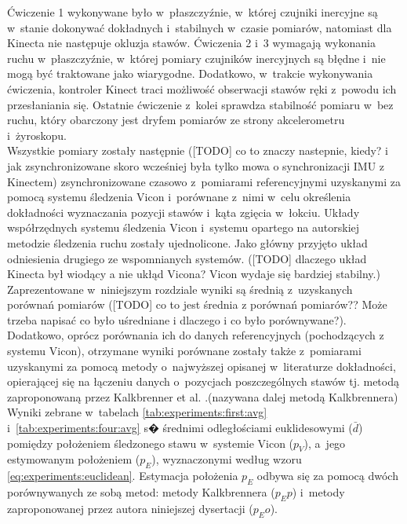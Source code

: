 Ćwiczenie 1 wykonywane było w~płaszczyźnie, w~której czujniki inercyjne są w~stanie dokonywać dokładnych i~stabilnych w~czasie pomiarów, natomiast dla Kinecta nie następuje okluzja stawów. Ćwiczenia 2 i~3 wymagają wykonania ruchu w~płaszczyźnie, w~której pomiary czujników inercyjnych są błędne i~nie mogą być traktowane jako wiarygodne. Dodatkowo, w~trakcie wykonywania ćwiczenia, kontroler Kinect traci możliwość obserwacji stawów ręki z~powodu ich przesłaniania się. Ostatnie ćwiczenie z~kolei sprawdza stabilność pomiaru w~bez ruchu, który obarczony jest dryfem pomiarów ze strony akcelerometru i~żyroskopu.\\

Wszystkie pomiary zostały następnie ([TODO] co to znaczy nastepnie, kiedy? i jak zsynchronizowane skoro wcześniej była tylko mowa o synchronizacji IMU z Kinectem) zsynchronizowane czasowo z~pomiarami referencyjnymi uzyskanymi za pomocą systemu śledzenia Vicon i~porównane z~nimi w~celu określenia dokładności wyznaczania pozycji stawów i~kąta zgięcia w~łokciu. Układy współrzędnych systemu śledzenia Vicon i~systemu opartego na autorskiej metodzie śledzenia ruchu zostały ujednolicone. Jako główny przyjęto układ odniesienia drugiego ze wspomnianych systemów. ([TODO] dlaczego układ Kinecta był wiodący a nie ukłąd Vicona? Vicon wydaje się bardziej stabilny.) Zaprezentowane w~niniejszym rozdziale wyniki są średnią z~uzyskanych porównań pomiarów ([TODO] co to jest średnia z porównań pomiarów?? Może trzeba napisać co było uśredniane i dlaczego i co było porównywane?). Dodatkowo, oprócz porównania ich do danych referencyjnych (pochodzących z systemu Vicon), otrzymane wyniki porównane zostały także z~pomiarami uzyskanymi za pomocą metody o~najwyższej opisanej w~literaturze dokładności, opierającej się na łączeniu danych o~pozycjach poszczególnych stawów tj. metodą zaproponowaną przez Kalkbrenner et al. \cite{Kalkbrenner2014}.(nazywana dalej metodą Kalkbrennera)\\
Wyniki zebrane w~tabelach \ref{tab:experiments:first:avg} i~\ref{tab:experiments:four:avg} s� średnimi odległościami euklidesowymi ($\bar{d}$) pomiędzy położeniem śledzonego stawu w~systemie Vicon ($p_V$), a~jego estymowanym położeniem ($p_E$), wyznaczonymi według wzoru \eqref{eq:experiments:euclidean}. Estymacja położenia $p_E$ odbywa się za pomocą dwóch porównywanych ze sobą metod: metody Kalkbrennera ($p_Ep$) i~metody zaproponowanej przez autora niniejszej dysertacji ($p_Eo$). 

